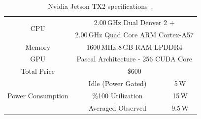 \documentclass[sigplan]{acmart}
\begin{document}
\renewcommand{\arraystretch}{0.7}
\begin{table}[t]
    \small
	\centering
	\vspace{0pt}
	\captionsetup{singlelinecheck=on,aboveskip=1pt}
	\caption{Nvidia Jetson TX2 specifications~\cite{jetson}.}
	\begin{tabular}{c | c | c}
		\toprule
        \multirow{2}{*}{\centering CPU } & \multicolumn{2}{c}{2.00\,GHz Dual Denver 2 +} \\
        & \multicolumn{2}{c}{2.00\,GHz Quad Core ARM Cortex-A57} \\
        \arrayrulecolor{black!20}\midrule\arrayrulecolor{black}
        Memory &  \multicolumn{2}{c}{1600\,MHz 8\,GB RAM LPDDR4} \\
        GPU & \multicolumn{2}{c}{Pascal Architecture - 256 CUDA Core} \\
        Total Price & \multicolumn{2}{c}{\$600} \\
        \midrule
        \multirow{3}{2cm}{\centering Power Consumption }
        &Idle (Power Gated)  & 5\,W \\
        &\%100 Utilization & 15\,W \\
        &Averaged Observed & 9.5\,W \\
		\bottomrule
	\end{tabular}
	\label{tab:jetson}
	\vspace{-10pt}
\end{table} \renewcommand{\arraystretch}{1}
\end{document}
